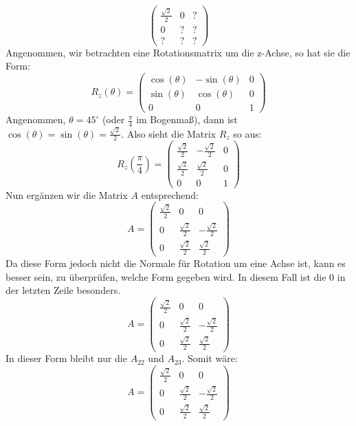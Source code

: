 \documentclass{article}
\begin{document}
    $$
    \begin{pmatrix}
    \frac{\sqrt{2}}{2} & 0 & ? \\
    0 & ? & ? \\
    ? & ? & ?
    \end{pmatrix} 
    $$
    Angenommen, wir betrachten eine Rotationsmatrix um die z-Achse, so hat sie die Form:
    $$ 
    R_z(\theta) = \begin{pmatrix}
    \cos(\theta) & -\sin(\theta) & 0 \\
    \sin(\theta) & \cos(\theta) & 0 \\
    0 & 0 & 1
    \end{pmatrix} 
    $$
    Angenommen, \(\theta = 45^\circ\) (oder \(\frac{\pi}{4}\) im Bogenmaß), dann ist \(\cos(\theta) = \sin(\theta) = \frac{\sqrt{2}}{2}\). Also sieht die Matrix \( R_z \) so aus:
    $$
    R_z\left(\frac{\pi}{4}\right) = \begin{pmatrix}
    \frac{\sqrt{2}}{2} & -\frac{\sqrt{2}}{2} & 0 \\
    \frac{\sqrt{2}}{2} & \frac{\sqrt{2}}{2} & 0 \\
    0 & 0 & 1
    \end{pmatrix}
    $$
    Nun ergänzen wir die Matrix \( A \) entsprechend:
    $$
    A = \begin{pmatrix}
    \frac{\sqrt{2}}{2} & 0 & 0 \\
    0 & \frac{\sqrt{2}}{2} & -\frac{\sqrt{2}}{2} \\
    0 & \frac{\sqrt{2}}{2} & \frac{\sqrt{2}}{2}
    \end{pmatrix}
    $$
    Da diese Form jedoch nicht die Normale für Rotation um eine Achse ist, kann es besser sein, zu überprüfen, welche Form gegeben wird. In diesem Fall ist die 0 in der letzten Zeile besonders.
    $$
    A = \begin{pmatrix}
    \frac{\sqrt{2}}{2} & 0 & 0 \\
    0 & \frac{\sqrt{2}}{2} & -\frac{\sqrt{2}}{2} \\
    0 & \frac{\sqrt{2}}{2} & \frac{\sqrt{2}}{2}
    \end{pmatrix}
    $$
    In dieser Form bleibt nur die \( A_{22} \) und \( A_{23} \). Somit wäre:
    $$
    A = \begin{pmatrix}
    \frac{\sqrt{2}}{2} & 0 & 0 \\
    0 & \frac{\sqrt{2}}{2} & -\frac{\sqrt{2}}{2} \\
    0 & \frac{\sqrt{2}}{2} & \frac{\sqrt{2}}{2}
    \end{pmatrix}
    $$
\end{document}
